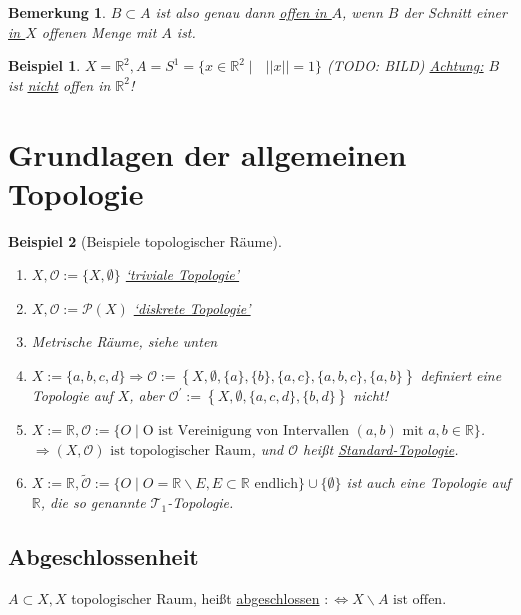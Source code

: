 \documentclass[a4paper,11pt,notitlepage]{report}
\newtheorem{remark}{Bemerkung}[chapter]
\newtheorem{example}{Beispiel}[chapter]
\newcommand{\R}{{\ensuremath{\mathbb{R}}}}
\newcommand{\OO}{{\ensuremath{\mathcal{O}}}}
\newenvironment{Kasten}[1]
{
\hspace{0.05\linewidth}
\begin{center}
\begin{minipage}{0.9\linewidth}
\setlength{\fboxsep}{10pt}
\definecolor{shadecolor}{gray}{1}
\definecolor{framecolor}{gray}{0}
\def\FrameCommand{\fcolorbox{framecolor}{shadecolor}}
\MakeFramed {\FrameRestore}
\subsection{#1}
\begin{itshape}
}
{
\end{itshape}
\endMakeFramed
\end{minipage}
\end{center}
}
\begin{document}
\begin{remark}
$B \subset A$ ist also genau dann \underline{offen \underline{in $A$}}, wenn $B$ der Schnitt einer \underline{in $X$} offenen Menge mit $A$ ist.
\end{remark}

\begin{example}
$X = \R^2, A = S^1 = \{ x \in \R^2 \mid \text{ } ||x|| = 1\}$ 
\newline
(TODO: BILD)
\newline
\underline{Achtung:} $B$ ist \underline{\underline{nicht}} offen in $\R^2$!
\end{example}

\section{Grundlagen der allgemeinen Topologie}
\begin{example}[Beispiele topologischer Räume]
	\begin{enumerate}[(1)]
		\item $X, \OO := \{X, \emptyset\}$ \underline{`triviale Topologie'}
		\item $X, \OO := \mathcal{P}(X)$ \underline{`diskrete Topologie'}
		\item Metrische Räume, siehe unten
		\item $X:= \{a,b,c,d\} \Rightarrow \OO := \left\{X, \emptyset, \{a\}, \{b\}, \{a,c\}, \{a,b,c\}, \{a,b\} \right \}$ definiert eine Topologie auf $X$, aber $\OO^\prime:= \left \{ X, \emptyset, \{a,c,d\}, \{b,d\} \right \}$ nicht!
		\item $X := \R, \OO := \{O \mid \text{O ist Vereinigung von Intervallen } (a,b) \text{ mit } a,b \in \R\}$. $\Rightarrow (X, \OO) \text{ ist topologischer Raum}$, und $\OO$ heißt \underline{Standard-Topologie}.
		\item $X:= \R, \tilde{\OO} := \{O \mid O = \R \backslash E, E \subset \R \text{ endlich}\} \cup \{\emptyset\}$ ist auch eine Topologie auf $\R$, die so genannte $\mathcal{T}_1$-Topologie.
	\end{enumerate}
\end{example}

\begin{Kasten}{Abgeschlossenheit}
	$A \subset X, X$ topologischer Raum, heißt \underline{abgeschlossen} $:\Leftrightarrow X \backslash A \text{ ist offen}$.
\end{Kasten}
\end{document}
